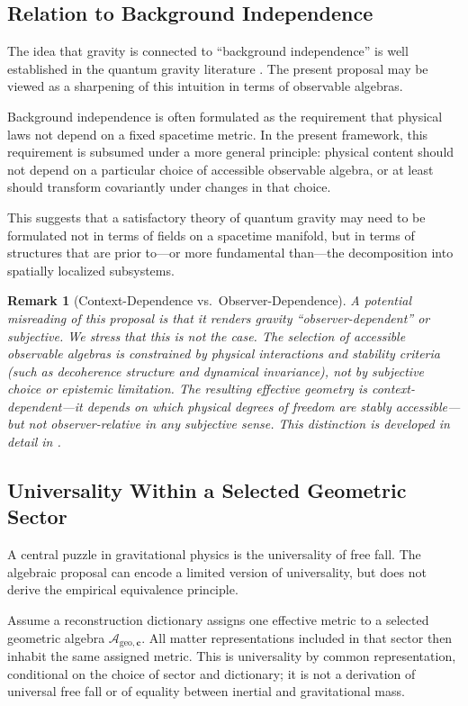 \documentclass[12pt,a4paper,openany]{book}
\newtheorem{remark}[theorem]{Remark}
\begin{document}
\subsection{Relation to Background Independence}

The idea that gravity is connected to ``background independence'' is well established in the quantum gravity literature \cite{Rovelli2004,Smolin2006}. The present proposal may be viewed as a sharpening of this intuition in terms of observable algebras.

Background independence is often formulated as the requirement that physical laws not depend on a fixed spacetime metric. In the present framework, this requirement is subsumed under a more general principle: physical content should not depend on a particular choice of accessible observable algebra, or at least should transform covariantly under changes in that choice.

This suggests that a satisfactory theory of quantum gravity may need to be formulated not in terms of fields on a spacetime manifold, but in terms of structures that are prior to—or more fundamental than—the decomposition into spatially localized subsystems.

\begin{remark}[Context-Dependence vs.\ Observer-Dependence]
A potential misreading of this proposal is that it renders gravity ``observer-dependent'' or subjective. We stress that this is not the case. The selection of accessible observable algebras is constrained by physical interactions and stability criteria (such as decoherence structure and dynamical invariance), not by subjective choice or epistemic limitation. The resulting effective geometry is \emph{context-dependent}—it depends on which physical degrees of freedom are stably accessible—but not \emph{observer-relative} in any subjective sense. This distinction is developed in detail in \cite{Liu2026PaperB}.
\end{remark}

\subsection{Universality Within a Selected Geometric Sector}

A central puzzle in gravitational physics is the universality of free fall.  The algebraic proposal can encode a limited version of universality, but does not derive the empirical equivalence principle.

Assume a reconstruction dictionary assigns one effective metric to a selected geometric algebra $\mathcal{A}_{\mathrm{geo},\mathbf{c}}$.  All matter representations included in that sector then inhabit the same assigned metric.  This is universality by common representation, conditional on the choice of sector and dictionary; it is not a derivation of universal free fall or of equality between inertial and gravitational mass.
\end{document}
